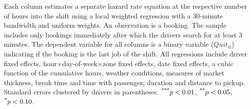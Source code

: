 \documentclass[reviewmode,AEJ]{AEA}
\begin{document}
\begin{table}[]
	\begin{tablenotes}
		\small
        Each column estimates a separate hazard rate equation at the respective number of hours into the shift using a local weighted regression with a 30-minute bandwidth and uniform weights. An observation is a booking. The sample includes only bookings immediately after which the drivers search for at least 3 minutes. The dependent variable for all columns is a binary variable ($Quit_{it}$) indicating if the booking is the last job of the shift. All regressions include driver fixed effects, hour\(\times\)day-of-week\(\times\)zone fixed effects, date fixed effects, a cubic function of the cumulative hours, weather conditions, measures of market thickness, break time and time with passenger, duration and distance to pickup. Standard errors clustered by drivers in parentheses. $\textsuperscript{***}p < 0.01$, $\textsuperscript{**}p < 0.05$, $\textsuperscript{*}p < 0.10$. 
	\end{tablenotes}
\end{table}
\end{document}

